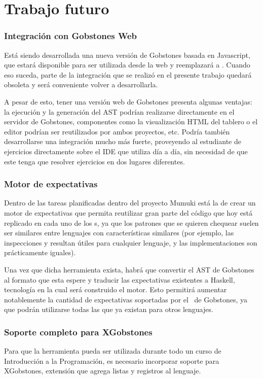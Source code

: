 
\section{Trabajo futuro}

\subsubsection{Integración con Gobstones Web}
Está siendo desarrollada una nueva versión de Gobstones basada en Javascript, que estará disponible para ser utilizada desde la web y reemplazará a \pyGob. Cuando eso suceda, parte de la integración que se realizó en el presente trabajo quedará obsoleta y será conveniente volver a desarrollarla.

A pesar de esto, tener una versión web de Gobstones presenta algunas ventajas: la ejecución y la generación del AST podrían realizarse directamente en el servidor de Gobstones, componentes como la visualización HTML del tablero o el editor podrían ser reutilizados por ambos proyectos, etc. Podría también desarrollarse una integración mucho más fuerte, proveyendo al estudiante de ejercicios directamente sobre el IDE que utiliza día a día, sin necesidad de que este tenga que resolver ejercicios en dos lugares diferentes.

\subsubsection{Motor de expectativas}
Dentro de las tareas planificadas dentro del proyecto Mumuki está la de crear un motor de expectativas que permita reutilizar gran parte del código que hoy está replicado en cada uno de los \runner s, ya que los patrones que se quieren chequear suelen ser similares entre lenguajes con características similares (por ejemplo, las inspecciones  y  resultan útiles para cualquier lenguaje, y las implementaciones son prácticamente iguales).

Una vez que dicha herramienta exista, habrá que convertir el AST de Gobstones al formato que esta espere y traducir las expectativas existentes a Haskell, tecnología en la cual será construido el motor. Esto permitirá aumentar notablemente la cantidad de expectativas soportadas por el \runner\ de Gobstones, ya que podrán utilizarse todas las que ya existan para otros lenguajes.

\subsubsection{Soporte completo para XGobstones}
Para que la herramienta pueda ser utilizada durante todo un curso de Introducción a la Programación, es necesario incorporar soporte para XGobstones, extensión que agrega listas y registros al lenguaje.

